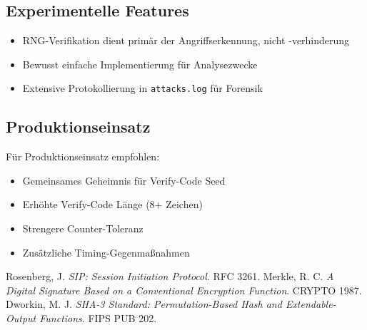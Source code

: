 \documentclass[10pt,a4paper]{article}
\begin{document}
\subsection{Experimentelle Features}

\begin{itemize}
\item RNG-Verifikation dient primär der Angriffserkennung, nicht -verhinderung
\item Bewusst einfache Implementierung für Analysezwecke
\item Extensive Protokollierung in \texttt{attacks.log} für Forensik
\end{itemize}

\subsection{Produktionseinsatz}

Für Produktionseinsatz empfohlen:
\begin{itemize}
\item Gemeinsames Geheimnis für Verify-Code Seed
\item Erhöhte Verify-Code Länge (8+ Zeichen)
\item Strengere Counter-Toleranz
\item Zusätzliche Timing-Gegenmaßnahmen
\end{itemize}

\begin{thebibliography}{9}
 Rosenberg, J. \emph{SIP: Session Initiation Protocol}. RFC 3261.
 Merkle, R. C. \emph{A Digital Signature Based on a Conventional Encryption Function}. CRYPTO 1987.
 Dworkin, M. J. \emph{SHA-3 Standard: Permutation-Based Hash and Extendable-Output Functions}. FIPS PUB 202.
\end{thebibliography}
\end{document}
